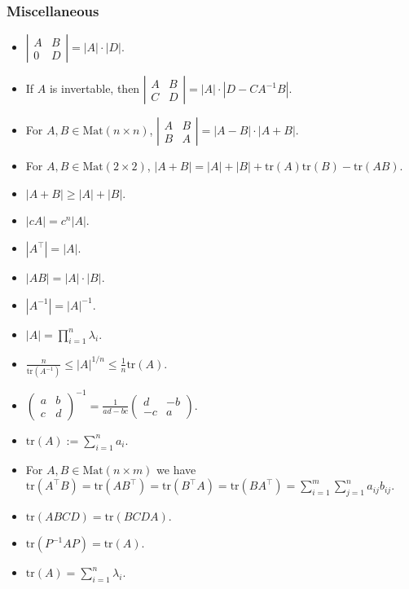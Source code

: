 \subsubsection{Miscellaneous}
\begin{itemize}
    \item $\left|\begin{array}{cc}A & B \\ 0 & D\end{array}\right| = |A|\cdot|D|$.
    \item If $A$ is invertable, then $\left|\begin{array}{cc}A & B \\ C & D\end{array}\right| = |A|\cdot|D - CA^{-1}B|$.
    \item For $A, B \in \text{Mat}(n \times n)$, $\left|\begin{array}{cc}A & B \\ B & A\end{array}\right| = |A - B|\cdot|A + B|$.
    \item For $A, B \in \text{Mat}(2 \times 2)$, $|A + B| = |A| + |B| + \text{tr}(A)\text{tr}(B) - \text{tr}(AB)$.
    \item $|A + B| \geq |A| + |B|$.
    \item $|cA| = c^n|A|$.
    \item $|A^\top| = |A|$.
    \item $|AB| = |A|\cdot|B|$.
    \item $|A^{-1}| = |A|^{-1}$.
    \item $|A| = \prod_{i=1}^n \lambda_i$.
    \item $\frac n{\text{tr}(A^{-1})} \leq |A|^{1/n} \leq \frac1n\text{tr}(A)$.
    \item $\left(\begin{array}{cc}a & b \\ c & d\end{array}\right)^{-1} = \frac1{ad - bc}\left(\begin{array}{cc}d & -b \\ -c & a\end{array}\right)$.
    \item $\text{tr}(A) := \sum_{i=1}^n a_i$.
    \item For $A, B \in \text{Mat}(n \times m)$ we have $\text{tr}(A^\top B) = \text{tr}(AB^\top) = \text{tr}(B^\top A) = \text{tr}(BA^\top) = \sum_{i=1}^m\sum_{j=1}^n a_{ij}b_{ij}$.
    \item $\text{tr}(ABCD) = \text{tr}(BCDA)$.
    \item $\text{tr}(P^{-1}AP) = \text{tr}(A)$.
    \item $\text{tr}(A) = \sum_{i=1}^n \lambda_i$.
\end{itemize}



